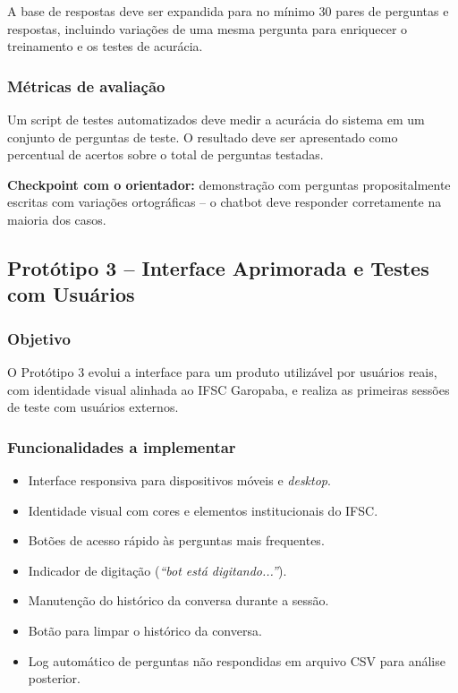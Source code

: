 A base de respostas deve ser expandida para no mínimo 30 pares de perguntas e respostas, incluindo variações de uma mesma pergunta para enriquecer o treinamento e os testes de acurácia.

\subsubsection{Métricas de avaliação}

Um script de testes automatizados deve medir a acurácia do sistema em um conjunto de perguntas de teste. O resultado deve ser apresentado como percentual de acertos sobre o total de perguntas testadas.

\textbf{Checkpoint com o orientador:} demonstração com perguntas propositalmente escritas com variações ortográficas -- o chatbot deve responder corretamente na maioria dos casos.

\subsection{Protótipo 3 -- Interface Aprimorada e Testes com Usuários}

\subsubsection{Objetivo}

O Protótipo 3 evolui a interface para um produto utilizável por usuários reais, com identidade visual alinhada ao IFSC Garopaba, e realiza as primeiras sessões de teste com usuários externos.

\subsubsection{Funcionalidades a implementar}

\begin{itemize}
    \item Interface responsiva para dispositivos móveis e \textit{desktop}.
    \item Identidade visual com cores e elementos institucionais do IFSC.
    \item Botões de acesso rápido às perguntas mais frequentes.
    \item Indicador de digitação (\textit{``bot está digitando...''}).
    \item Manutenção do histórico da conversa durante a sessão.
    \item Botão para limpar o histórico da conversa.
    \item Log automático de perguntas não respondidas em arquivo CSV para análise posterior.
\end{itemize}

